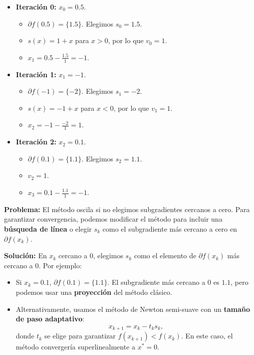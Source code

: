 \documentclass[12pt]{book}
\theoremstyle{definition}
\theoremstyle{plain}
\theoremstyle{remark}
\begin{document}
\begin{itemize}
    \item \textbf{Iteración 0:} \( x_0 = 0.5 \).
      \begin{itemize}
        \item \( \partial f(0.5) = \{1.5\} \). Elegimos \( s_0 = 1.5 \).
        \item \( s(x) = 1 + x \) para \( x > 0 \), por lo que \( v_0 = 1 \).
        \item \( x_1 = 0.5 - \frac{1.5}{1} = -1 \).
      \end{itemize}

    \item \textbf{Iteración 1:} \( x_1 = -1 \).
      \begin{itemize}
        \item \( \partial f(-1) = \{-2\} \). Elegimos \( s_1 = -2 \).
        \item \( s(x) = -1 + x \) para \( x < 0 \), por lo que \( v_1 = 1 \).
        \item \( x_2 = -1 - \frac{-2}{1} = 1 \).
      \end{itemize}

    \item \textbf{Iteración 2:} \( x_2 = 0.1 \).
      \begin{itemize}
        \item \( \partial f(0.1) = \{1.1\} \). Elegimos \( s_2 = 1.1 \).
        \item \( v_2 = 1 \).
        \item \( x_3 = 0.1 - \frac{1.1}{1} = -1 \).
      \end{itemize}
\end{itemize}

\medskip
\textbf{Problema:} El método oscila si no elegimos subgradientes cercanos a cero. Para garantizar convergencia, podemos modificar el método para incluir una \textbf{búsqueda de línea} o elegir \( s_k \) como el subgradiente más cercano a cero en \( \partial f(x_k) \).

\medskip
\textbf{Solución:} En \( x_k \) cercano a \( 0 \), elegimos \( s_k \) como el elemento de \( \partial f(x_k) \) más cercano a \( 0 \). Por ejemplo:
\begin{itemize}
    \item Si \( x_k = 0.1 \), \( \partial f(0.1) = \{1.1\} \). El subgradiente más cercano a \( 0 \) es \( 1.1 \), pero podemos usar una \textbf{proyección} del método clásico.
    \item Alternativamente, usamos el método de Newton semi-suave con un \textbf{tamaño de paso adaptativo}:
      \[
      x_{k+1} = x_k - t_k s_k,
      \]
      donde \( t_k \) se elige para garantizar \( f(x_{k+1}) < f(x_k) \). En este caso, el método convergería superlinealmente a \( x^* = 0 \).
\end{itemize}
\end{document}
